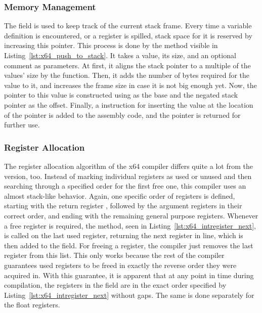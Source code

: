 \subsubsection{Memory Management}

The  field is used to keep track of the current stack frame.
Every time a variable definition is encountered, or a register is spilled, stack space for it is reserved by increasing this pointer.
This process is done by the  method visible in Listing~\ref{lst:x64_push_to_stack}.
It takes a value, its size, and an optional comment as parameters.
At first, it aligns the stack pointer to a multiple of the values' size by the  function.
Then, it adds the number of bytes required for the value to it, and increases the frame size in case it is not big enough yet.
Now, the pointer to this value is constructed using  as the base and the negated stack pointer as the offset.
Finally, a  instruction for inserting the value at the location of the pointer is added to the assembly code, and the pointer is returned for further use.



\subsubsection{Register Allocation}


The register allocation algorithm of the x64 compiler differs quite a lot from the \riscv{} version, too.
Instead of marking individual registers as used or unused and then searching through a specified order for the first free one, this compiler uses an almost stack-like behavior.
Again, one specific order of registers is defined, starting with the return register , followed by the argument registers in their correct order, and ending with the remaining general purpose registers.
Whenever a free register is required, the  method, seen in Listing~\ref{lst:x64_intregister_next}, is called on the last used register, returning the next register in line, which is then added to the  field.
For freeing a register, the compiler just removes the last register from this list.
This only works because the rest of the compiler guarantees used registers to be freed in exactly the reverse order they were acquired in.
With this guarantee, it is apparent that at any point in time during compilation, the registers in the  field are in the exact order specified by Listing~\ref{lst:x64_intregister_next} without gaps.
The same is done separately for the float registers.

